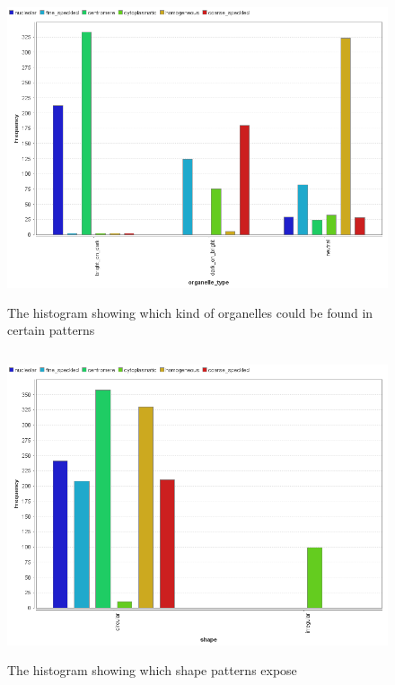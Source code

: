 \begin{figure}
	\begin{center}
		\includegraphics[width=14cm, height=9cm]{Figures/AppendixA/organelle_type}
		\caption{The histogram showing which kind of organelles could be found in certain patterns}
	\end{center}
\end{figure}

\begin{figure}
	\begin{center}
		\includegraphics[width=14cm, height=9cm]{Figures/AppendixA/shape}
		\caption{The histogram showing which shape patterns expose}
	\end{center}
\end{figure}